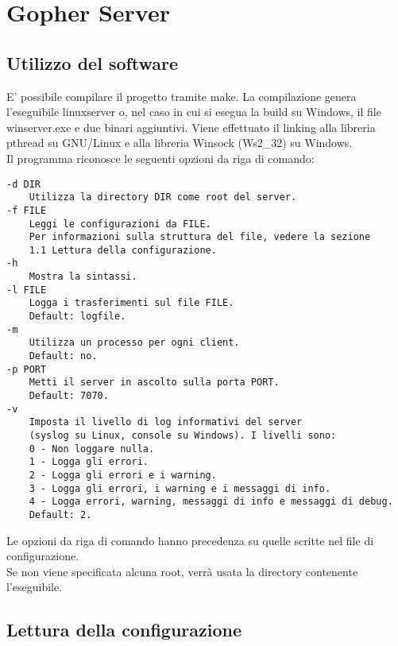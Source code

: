 \documentclass{article}
\begin{document}
\section*{Gopher Server}

\subsection*{Utilizzo del software}

E' possibile compilare il progetto tramite make. La compilazione genera l'eseguibile linuxserver o,
nel caso in cui si esegua la build su Windows, il file winserver.exe e due binari aggiuntivi.
Viene effettuato il linking alla libreria pthread su GNU/Linux e alla libreria Winsock (Ws2\_32) su Windows.\\
Il programma riconosce le seguenti opzioni da riga di comando:\\
\begin{lstlisting}
-d DIR
    Utilizza la directory DIR come root del server.
-f FILE 
    Leggi le configurazioni da FILE. 
    Per informazioni sulla struttura del file, vedere la sezione 
    1.1 Lettura della configurazione.
-h
    Mostra la sintassi.
-l FILE
    Logga i trasferimenti sul file FILE. 
    Default: logfile.
-m 
    Utilizza un processo per ogni client. 
    Default: no.
-p PORT
    Metti il server in ascolto sulla porta PORT. 
    Default: 7070.
-v
    Imposta il livello di log informativi del server 
    (syslog su Linux, console su Windows). I livelli sono:
    0 - Non loggare nulla.
    1 - Logga gli errori.
    2 - Logga gli errori e i warning.
    3 - Logga gli errori, i warning e i messaggi di info.
    4 - Logga errori, warning, messaggi di info e messaggi di debug.
    Default: 2.

\end{lstlisting}
Le opzioni da riga di comando hanno precedenza su quelle scritte nel file di configurazione.\\
Se non viene specificata alcuna root, verrà usata la directory contenente l'eseguibile.

\subsection*{Lettura della configurazione}
\end{document}
